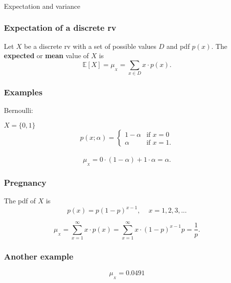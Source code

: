 \begin{frame}[fragile]\frametitle{}
\begin{center}
{\Large Expectation and variance}

\end{center}
\end{frame}




\begin{frame}[fragile]\frametitle{Expectation of a discrete rv}
\begin{defn}
Let $X$ be a discrete rv with a set of possible values $D$ and pdf
$p(x)$. The {\bf expected} or {\bf mean} value of $X$ is
$$ \mathbb E[X] = \mu_{_X} = \sum_{x \in D} x \cdot p(x).$$
\end{defn}

\end{frame}



\begin{frame}[fragile]\frametitle{Examples}

Bernoulli:

$X = \{0,1\}$ \\
$$p(x;\alpha) = \left\{\begin{array}{ll}
			1-\alpha & \mbox{if } x =0 \\
			\alpha & \mbox{if } x=1
						   .	\end{array}
						\right. $$ 	 \\ 

$$\mu_{_X} = 0 \cdot (1-\alpha) + 1 \cdot \alpha = \alpha.$$


\end{frame}



\begin{frame}[fragile]\frametitle{Pregnancy}

The pdf of $X$ is
$$p(x) = p(1-p)^{x-1}, \, \, \, \, \, \, \, x=1,2,3,...$$ 

$$\mu_{_X} = \sum_{x=1}^\infty x \cdot p(x) = \sum_{x=1}^\infty x \cdot
(1-p)^{x-1}p= \frac{1}{p}.$$ 


\end{frame}



\begin{frame}[fragile]\frametitle{Another example}

$$\mu_{_X} = 0.0491$$ 

\end{frame}



